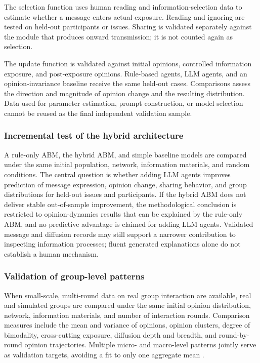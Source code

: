 \documentclass[11pt,a4paper]{article}
\begin{document}
The selection function uses human reading and information-selection data to estimate whether a message enters actual exposure. Reading and ignoring are tested on held-out participants or issues. Sharing is validated separately against the module that produces onward transmission; it is not counted again as selection.

The update function is validated against initial opinions, controlled information exposure, and post-exposure opinions. Rule-based agents, LLM agents, and an opinion-invariance baseline receive the same held-out cases. Comparisons assess the direction and magnitude of opinion change and the resulting distribution. Data used for parameter estimation, prompt construction, or model selection cannot be reused as the final independent validation sample.

\subsubsection{Incremental test of the hybrid architecture}

A rule-only ABM, the hybrid ABM, and simple baseline models are compared under the same initial population, network, information materials, and random conditions. The central question is whether adding LLM agents improves prediction of message expression, opinion change, sharing behavior, and group distributions for held-out issues and participants. If the hybrid ABM does not deliver stable out-of-sample improvement, the methodological conclusion is restricted to opinion-dynamics results that can be explained by the rule-only ABM, and no predictive advantage is claimed for adding LLM agents. Validated message and diffusion records may still support a narrower contribution to inspecting information processes; fluent generated explanations alone do not establish a human mechanism.

\subsubsection{Validation of group-level patterns}

When small-scale, multi-round data on real group interaction are available, real and simulated groups are compared under the same initial opinion distribution, network, information materials, and number of interaction rounds. Comparison measures include the mean and variance of opinions, opinion clusters, degree of bimodality, cross-cutting exposure, diffusion depth and breadth, and round-by-round opinion trajectories. Multiple micro- and macro-level patterns jointly serve as validation targets, avoiding a fit to only one aggregate mean \cite{grimm2005}.
\end{document}
